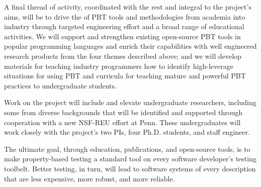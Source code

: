 
A final thread of activity, coordinated with the rest and integral to the
project's aims, will
%
be to drive the  of PBT tools and
methodologies from academia into industry through targeted engineering effort
and a broad range of educational activities.
We will support and strengthen existing
open-source PBT tools in popular programming languages and enrich their
capabilities with well engineered research products from the four
themes described above;
%
and we will
develop materials for teaching industry programmers how to identify
high-leverage situations for using PBT and curricula for teaching mature
and powerful PBT practices to undergraduate students. 
%

Work on the project will include and elevate undergraduate
researchers, including some from diverse backgrounds that will be
identified and supported through cooperation with a new NSF-REU effort
at Penn. These undergraduates will work closely with the project's two
PIs, four Ph.D.{} students, and staff engineer.

The ultimate goal, through education, publications, and open-source
tools, is to make property-based testing a standard tool on every
software developer's testing toolbelt.  Better testing, in turn, will
lead to software systems of every description that are less expensive, more
robust, and more reliable.


